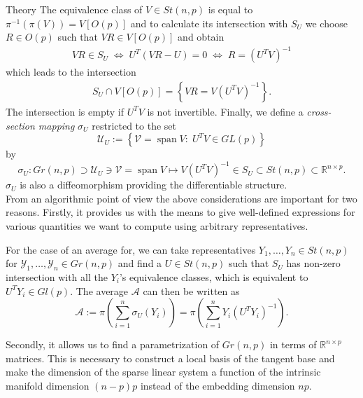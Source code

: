 \begin{chapter}{Theory}
The equivalence class of $V\in St(n,p)$ is equal to $\pi^{-1}(\pi(V))=V[O(p)]$ and to calculate its intersection with $S_U$ we choose $R\in O(p)$ such that
$VR\in V[O(p)]$ and obtain
\begin{align}
    VR\in S_U\;\Leftrightarrow\; U^T(VR-U)=0 \;\Leftrightarrow\; R = (U^TV)^{-1}
\end{align}
which leads to the intersection
\begin{align}
    S_U \cap V[O(p)] = \left\lbrace VR = V(U^{T}V)^{-1} \right\rbrace .
\end{align}
The intersection is empty if $U^{T}V$ is not invertible. Finally, we define a \emph{cross-section mapping} $\sigma_U$ restricted to the set
\begin{equation}
    \mathcal{U}_U := \left\lbrace\mathcal{V}=\operatorname{span}V:\; U^TV\in GL(p) \right\rbrace
\end{equation}
by 
\begin{equation}
\label{eq:crosssectionmap}
    \sigma_U: Gr(n,p)\supset \mathcal{U}_U\ni\mathcal{V}=\operatorname{span}V\mapsto V(U^{T}V)^{-1} \in S_U \subset St(n,p)\subset \mathbb{R}^{n\times p}.
\end{equation}
$\sigma_U$ is also a diffeomorphism providing the differentiable structure.\\

From an algorithmic point of view the above considerations are important for two reasons.
Firstly, it provides us with the means to give well-defined expressions for various quantities we want to compute using arbitrary representatives.
\begin{example}[Average]
For the case of an average for, we can take representatives $Y_1,\ldots,Y_n\in St(n,p)$ for $\mathcal{Y}_1,\ldots,\mathcal{Y}_n\in Gr(n,p)$
and find a $U\in St(n,p)$ such that $S_U$ has non-zero intersection with all the $Y_i$'s equivalence classes, which is equivalent
to $U^TY_i\in Gl(p)$. The average $\mathcal{A}$ can then be written as
\begin{equation}
    \mathcal{A} := \pi\left(\sum_{i=1}^{n}\sigma_U(Y_i)\right)=\pi\left(\sum_{i=1}^{n}Y_i(U^{T}Y_i)^{-1}\right).
\end{equation}
\end{example}

Secondly, it allows us to find a parametrization of $Gr(n,p)$ in terms of $\mathbb{R}^{n\times p}$ matrices. This is necessary to construct a local basis of the tangent base
and make the dimension of the sparse linear system a function of the intrinsic manifold dimension $(n-p)p$ instead of the embedding dimension $np$.


\end{chapter}
